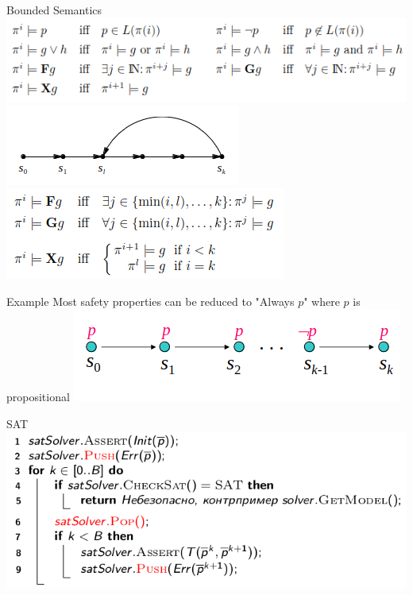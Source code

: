 \documentclass{beamer}
\begin{document}
\begin{frame}{Bounded Semantics}
\includegraphics[scale=0.5]{bs1.png}
\includegraphics[scale=0.5]{lasso.png}
\includegraphics[scale=0.5]{bs2.png}
\end{frame}

\begin{frame}{Example}
Most safety properties can be reduced to "Always $p$" where $p$ is propositional\newline
\includegraphics[scale=0.5]{ex2.png}
\end{frame}

\begin{frame}{SAT}
\includegraphics[scale=0.5]{sat.png}
\end{frame}
\end{document}
